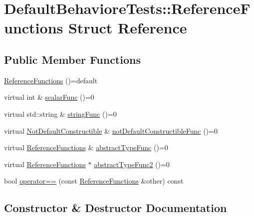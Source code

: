 \hypertarget{structDefaultBehavioreTests_1_1ReferenceFunctions}{}\section{Default\+Behaviore\+Tests\+::Reference\+Functions Struct Reference}
\label{structDefaultBehavioreTests_1_1ReferenceFunctions}
\subsection*{Public Member Functions}
\begin{DoxyCompactItemize}
\item 
\mbox{\hyperlink{structDefaultBehavioreTests_1_1ReferenceFunctions_a55195b5ede9a29134b86972f7198f027}{Reference\+Functions}} ()=default
\item 
virtual int \& \mbox{\hyperlink{structDefaultBehavioreTests_1_1ReferenceFunctions_a5b15e9a69ede4b93ff1a101a47b3d2a1}{scalar\+Func}} ()=0
\item 
virtual std\+::string \& \mbox{\hyperlink{structDefaultBehavioreTests_1_1ReferenceFunctions_a9570c6e84e3e2e0a6805fd26122cceab}{string\+Func}} ()=0
\item 
virtual \mbox{\hyperlink{structDefaultBehavioreTests_1_1NotDefaultConstructible}{Not\+Default\+Constructible}} \& \mbox{\hyperlink{structDefaultBehavioreTests_1_1ReferenceFunctions_a088a5a5e86bf4b2bdccfd945073d0d4e}{not\+Default\+Constructible\+Func}} ()=0
\item 
virtual \mbox{\hyperlink{structDefaultBehavioreTests_1_1ReferenceFunctions}{Reference\+Functions}} \& \mbox{\hyperlink{structDefaultBehavioreTests_1_1ReferenceFunctions_a6266d3f96330937bb352e90f60e688f6}{abstract\+Type\+Func}} ()=0
\item 
virtual \mbox{\hyperlink{structDefaultBehavioreTests_1_1ReferenceFunctions}{Reference\+Functions}} $\ast$ \mbox{\hyperlink{structDefaultBehavioreTests_1_1ReferenceFunctions_a86e3c449407ce046dde1b4a2fa684f38}{abstract\+Type\+Func2}} ()=0
\item 
bool \mbox{\hyperlink{structDefaultBehavioreTests_1_1ReferenceFunctions_aa56fb69082f7e692227059c4f197c6f5}{operator==}} (const \mbox{\hyperlink{structDefaultBehavioreTests_1_1ReferenceFunctions}{Reference\+Functions}} \&other) const
\end{DoxyCompactItemize}


\subsection{Constructor \& Destructor Documentation}
\mbox{\label{structDefaultBehavioreTests_1_1ReferenceFunctions_a55195b5ede9a29134b86972f7198f027}} 
